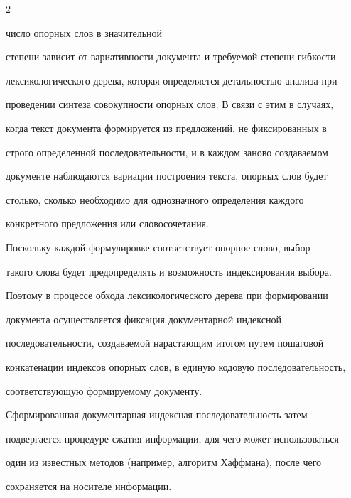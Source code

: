 \begin{multicols}{2}
\bigskip


\addtocounter{figure}{1}








\noindent 


число опорных слов в значительной 


степени зависит от вариативности документа и требуемой степени гибкости 


лексикологического дерева, которая определяется детальностью анализа при 


проведении синтеза совокупности опорных слов. В связи с этим в случаях, 


когда текст документа формируется из предложений, не фиксированных в 


строго определенной последовательности, и в каждом заново создаваемом 


документе наблюдаются вариации построения текста, опорных слов будет 


столько, сколько необходимо для однозначного определения каждого 


конкретного предложения или словосочетания.


     


     Поскольку каждой формулировке соответствует опорное слово, выбор 


такого слова будет пред\-опре\-де\-лять и возможность индексирования выбора. 


Поэтому в процессе обхода лексикологического дерева при формировании 


документа осуществляется фиксация документарной индексной 


последовательности, создаваемой нарастающим итогом путем пошаговой 


конкатенации индексов опорных слов, в единую кодовую последовательность, 


соответствующую формируемому документу.


     


     Сформированная документарная индексная последовательность затем 


подвергается процедуре сжатия информации, для чего может использоваться 


один из известных методов (например, алгоритм Хаффмана), после чего 


сохраняется на носителе информации.



\end{multicols}
